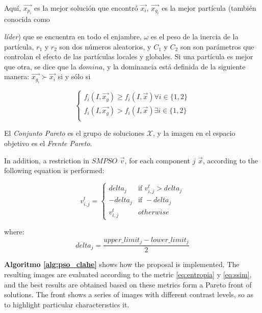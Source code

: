 \documentclass[spanish,twocolumn]{article}
\begin{document}
Aquí, $\overrightarrow{x_{p_i}}$ es la mejor solución que encontró $\overrightarrow{x_i}$, $\overrightarrow{x_{g_i}}$ es la mejor partícula (también conocida como {{\it líder}) que se encuentra en todo el enjambre, $\omega$ es el peso de la inercia de la partícula, $r_1$ y $r_2$ son dos números aleatorios, y $C_1$ y $C_2$ son son parámetros que controlan el efecto de las partículas locales  y globales. Si una partícula es mejor que otra, se dice que la $domina$, y la dominancia está definida de la siguiente manera: $\overrightarrow{x_{g_i}} \succ \overrightarrow{x_i}$ si y sólo si

\begin{equation}\label{eq:dominanciapareto}
         \begin{cases}  f_i(I,\overrightarrow{x_{g}})  \geq f_i(I,\overrightarrow{x}) \forall i \in \{1,2\} \\
                        f_i(I,\overrightarrow{x_{g}}) > f_i(I,\overrightarrow{x}) \exists i \in \{1,2\} \\
         \end{cases}
\end{equation}

El {\it Conjunto Pareto} es el grupo de soluciones $\mathscr{X}$, y la imagen en el espacio objetivo es el {\it Frente Pareto}.

In addition, a restriction in $SMPSO$ $\overrightarrow{v}$, for each component $j$ $\overrightarrow{x}$, according to the following equation is performed:

                
\begin{equation}\label{eq:restricciondelta}
    v_{i,j}^t = \begin{cases}  delta_j &\mbox{if } v_{i,j}^t > delta_j \\
                                -delta_j & \mbox{if } -delta_j \\
                                v_{i,j}^t & otherwise \end{cases}
\end{equation}

where: 
\begin{equation} \label{eq:restricciondelta2}
delta_j= \frac{upper\_limit_j - lower\_limit_j}{2}
\end{equation}

\textbf{Algoritmo \ref{alg:pso_clahe}} shows how the proposal is implemented. The resulting images are evaluated according to the metric \eqref{eq:entropia} y \eqref{eq:ssim}, and the best results are obtained based on these metrics form a Pareto front of solutions. The front shows a series of images with different contrast levels, so as to highlight particular characterıstics it.

}
\end{document}

